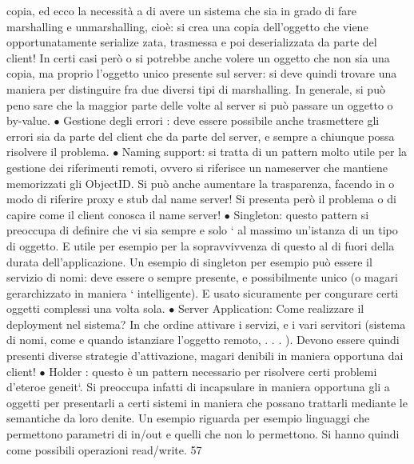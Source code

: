 \documentclass[a4paper,12pt]{article}
\begin{document}
copia, ed ecco la necessità
a
di avere un sistema che sia in grado di fare marshalling e unmarshalling,
cioè: si crea una copia dell'oggetto che viene opportunatamente serialize
zata, trasmessa e poi deserializzata da parte del client! In certi casi però
o
si potrebbe anche volere un oggetto che non sia una copia, ma proprio
l'oggetto unico presente sul server: si deve quindi trovare una maniera per
distinguire fra due diversi tipi di marshalling. In generale, si può peno
sare che la maggior parte delle volte al server si può passare un oggetto
o
by-value.
$\bullet$ Gestione degli errori : deve essere possibile anche trasmettere gli errori
sia da parte del client che da parte del server, e sempre a chiunque possa
risolvere il problema.
$\bullet$ Naming support: si tratta di un pattern molto utile per la gestione dei
riferimenti remoti, ovvero si riferisce un nameserver che mantiene memorizzati gli ObjectID. Si può anche aumentare la
trasparenza, facendo in
o
modo di riferire proxy e stub dal name server! Si presenta però il problema
o
di capire come il client conosca il name server!
$\bullet$ Singleton: questo pattern si preoccupa di definire che vi sia sempre e solo
`
al massimo un'istanza di un tipo di oggetto. E utile per esempio per
la sopravvivvenza di questo al di fuori della durata dell'applicazione. Un
esempio di singleton per esempio può essere il servizio di nomi: deve essere
o
sempre presente, e possibilmente unico (o magari gerarchizzato in maniera
`
intelligente). E usato sicuramente per congurare certi oggetti complessi
una volta sola.
$\bullet$ Server Application: Come realizzare il deployment nel sistema? In che
ordine attivare i servizi, e i vari servitori (sistema di nomi, come e quando
istanziare l'oggetto remoto, . . . ). Devono essere quindi presenti diverse
strategie d'attivazione, magari denibili in maniera opportuna dai client!
$\bullet$ Holder : questo è un pattern necessario per risolvere certi problemi d'eteroe
geneit`. Si preoccupa infatti di incapsulare in maniera opportuna gli
a
oggetti per presentarli a certi sistemi in maniera che possano trattarli
mediante le semantiche da loro denite. Un esempio riguarda per esempio linguaggi che permettono parametri di in/out e
quelli che non lo
permettono. Si hanno quindi come possibili operazioni read/write.
57
\end{document}
